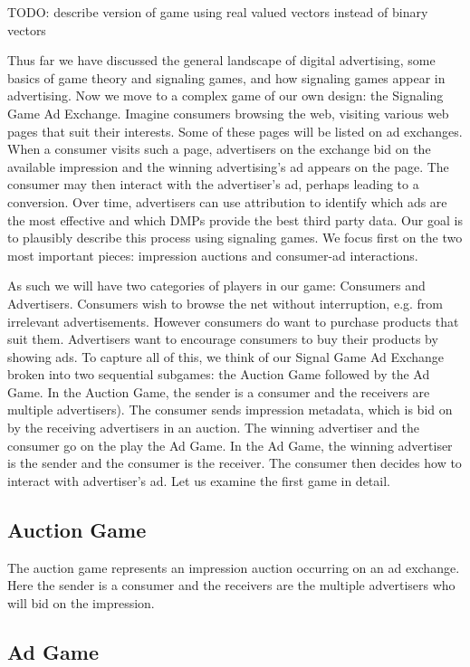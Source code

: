 \documentclass{article}
\begin{document}
TODO: describe version of game using real valued vectors instead of binary vectors

Thus far we have discussed the general landscape of digital advertising, some basics of game theory and signaling games, and how signaling games appear in advertising. Now we move to a complex game of our own design: the Signaling Game Ad Exchange. Imagine consumers browsing the web, visiting various web pages that suit their interests. Some of these pages will be listed on ad exchanges. When a consumer visits such a page, advertisers on the exchange bid on the available impression and the winning advertising's ad appears on the page. The consumer may then interact with the advertiser's ad, perhaps leading to a conversion. Over time, advertisers can use attribution to identify which ads are the most effective and which DMPs provide the best third party data. Our goal is to plausibly describe this process using signaling games. We focus first on the two most important pieces: impression auctions and consumer-ad interactions.

As such we will have two categories of players in our game: Consumers and Advertisers. Consumers wish to browse the net without interruption, e.g. from irrelevant advertisements. However consumers do want to purchase products that suit them. Advertisers want to encourage consumers to buy their products by showing ads. To capture all of this, we think of our Signal Game Ad Exchange broken into two sequential subgames: the Auction Game followed by the Ad Game. In the Auction Game, the sender is a consumer and the receivers are multiple advertisers). The consumer sends impression metadata, which is bid on by the receiving advertisers in an auction. The winning advertiser and the consumer go on the play the Ad Game. In the Ad Game, the winning advertiser is the sender and the consumer is the receiver. The consumer then decides how to interact with advertiser's ad. Let us examine the first game in detail.

\subsection{Auction Game}

The auction game represents an impression auction occurring on an ad exchange. Here the sender is a consumer and the receivers are the multiple advertisers who will bid on the impression. 

\subsection{Ad Game}
\end{document}
